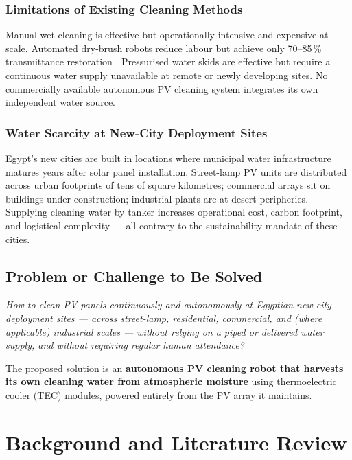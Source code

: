 \documentclass[12pt,a4paper]{report}
\numberwithin{equation}{chapter}
\numberwithin{figure}{chapter}
\numberwithin{table}{chapter}
\begin{document}
\subsection{Limitations of Existing Cleaning Methods}

Manual wet cleaning is effective but operationally intensive and expensive at scale.
Automated dry-brush robots reduce labour but achieve only 70--85\,\% transmittance
restoration \cite{mejia2021cleaning,costa2021pvrobot}. Pressurised water skids are
effective but require a continuous water supply unavailable at remote or newly developing
sites. No commercially available autonomous PV cleaning system integrates its own
independent water source.

\subsection{Water Scarcity at New-City Deployment Sites}

Egypt's new cities are built in locations where municipal water infrastructure matures
years after solar panel installation. Street-lamp PV units are distributed across urban
footprints of tens of square kilometres; commercial arrays sit on buildings under
construction; industrial plants are at desert peripheries. Supplying cleaning water by
tanker increases operational cost, carbon footprint, and logistical complexity --- all
contrary to the sustainability mandate of these cities.

\section{Problem or Challenge to Be Solved}

\textit{How to clean PV panels continuously and autonomously at Egyptian new-city
deployment sites --- across street-lamp, residential, commercial, and (where
applicable) industrial scales --- without
relying on a piped or delivered water supply, and without requiring regular human
attendance?}

The proposed solution is an \textbf{autonomous PV cleaning robot that harvests its own
cleaning water from atmospheric moisture} using thermoelectric cooler (TEC) modules,
powered entirely from the PV array it maintains.

\chapter{Background and Literature Review}
\end{document}
